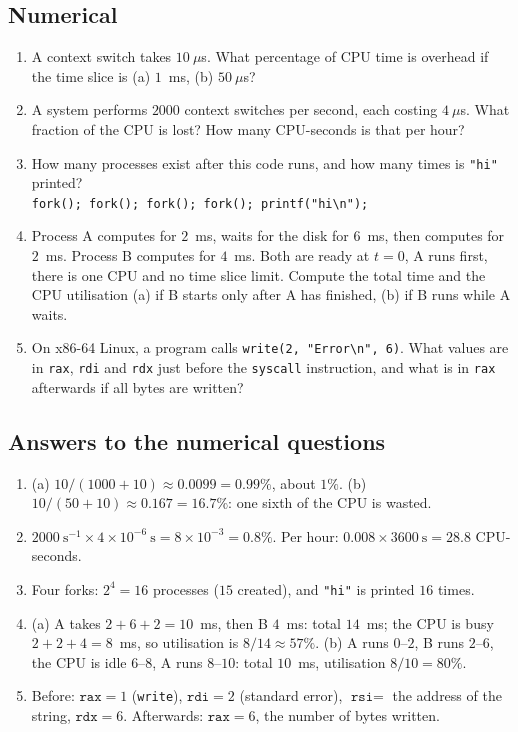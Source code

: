 \documentclass[11pt,a4paper]{article}
\newcommand{\cmd}[1]{\texttt{#1}}
\begin{document}
\subsection*{Numerical}
\begin{enumerate}[leftmargin=1.6em,resume]
  \item A context switch takes $10\ \mu$s. What percentage of CPU time is overhead if the time slice is (a) $1$~ms, (b) $50\ \mu$s?
  \item A system performs $2000$ context switches per second, each costing $4\ \mu$s. What fraction of the CPU is lost? How many CPU-seconds is that per hour?
  \item How many processes exist after this code runs, and how many times is \texttt{"hi"} printed?\\ \texttt{fork(); fork(); fork(); fork(); printf("hi\textbackslash n");}
  \item Process A computes for $2$~ms, waits for the disk for $6$~ms, then computes for $2$~ms. Process B computes for $4$~ms. Both are ready at $t = 0$, A runs first, there is one CPU and no time slice limit. Compute the total time and the CPU utilisation (a) if B starts only after A has finished, (b) if B runs while A waits.
  \item On x86-64 Linux, a program calls \cmd{write(2, "Error\textbackslash n", 6)}. What values are in \texttt{rax}, \texttt{rdi} and \texttt{rdx} just before the \texttt{syscall} instruction, and what is in \texttt{rax} afterwards if all bytes are written?
\end{enumerate}

\subsection*{Answers to the numerical questions}
\begin{enumerate}[leftmargin=1.6em,start=8]
  \item (a) $10/(1000 + 10) \approx 0.0099 = 0.99\%$, about $1\%$. (b) $10/(50 + 10) \approx 0.167 = 16.7\%$: one sixth of the CPU is wasted.
  \item $2000\ \text{s}^{-1} \times 4\times10^{-6}\ \text{s} = 8\times10^{-3} = 0.8\%$. Per hour: $0.008 \times 3600\ \text{s} = 28.8$ CPU-seconds.
  \item Four forks: $2^{4} = 16$ processes ($15$ created), and \texttt{"hi"} is printed $16$ times.
  \item (a) A takes $2 + 6 + 2 = 10$~ms, then B $4$~ms: total $14$~ms; the CPU is busy $2 + 2 + 4 = 8$~ms, so utilisation is $8/14 \approx 57\%$. (b) A runs $0$--$2$, B runs $2$--$6$, the CPU is idle $6$--$8$, A runs $8$--$10$: total $10$~ms, utilisation $8/10 = 80\%$.
  \item Before: $\texttt{rax} = 1$ (\cmd{write}), $\texttt{rdi} = 2$ (standard error), $\texttt{rsi} =$ the address of the string, $\texttt{rdx} = 6$. Afterwards: $\texttt{rax} = 6$, the number of bytes written.
\end{enumerate}
\end{document}
